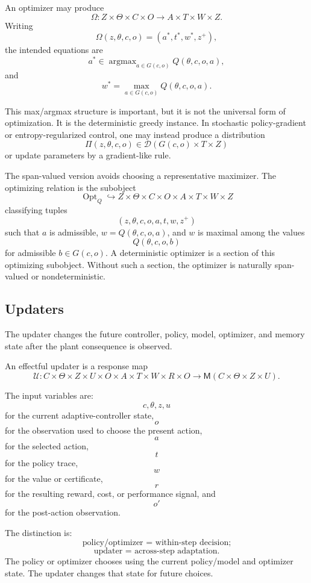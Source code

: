 An optimizer may produce
\[
\Omega:Z\times\Theta\times C\times O
\longrightarrow A\times T\times W\times Z.
\]
Writing
\[
\Omega(z,\theta,c,o)=(a^\ast,t^\ast,w^\ast,z^+),
\]
the intended equations are
\[
a^\ast\in \operatorname{argmax}_{a\in G(c,o)}Q(\theta,c,o,a),
\]
and
\[
w^\ast=\max_{a\in G(c,o)}Q(\theta,c,o,a).
\]

This max/argmax structure is important, but it is not the universal form of optimization.  It is
the deterministic greedy instance.  In stochastic policy-gradient or entropy-regularized control,
one may instead produce a distribution
\[
\Pi(z,\theta,c,o)\in \mathcal D(G(c,o)\times T\times Z)
\]
or update parameters by a gradient-like rule.

The span-valued version avoids choosing a representative maximizer.  The optimizing relation is the
subobject
\[
\operatorname{Opt}_Q
\hookrightarrow
Z\times\Theta\times C\times O\times A\times T\times W\times Z
\]
classifying tuples
\[
(z,\theta,c,o,a,t,w,z^+)
\]
such that \(a\) is admissible, \(w=Q(\theta,c,o,a)\), and \(w\) is maximal among the values
\[
Q(\theta,c,o,b)
\]
for admissible \(b\in G(c,o)\).  A deterministic optimizer is a section of this optimizing
subobject.  Without such a section, the optimizer is naturally span-valued or nondeterministic.

\subsection{Updaters}
\label{subsec:effectful-updaters}

The updater changes the future controller, policy, model, optimizer, and memory state after the
plant consequence is observed.

\begin{definition}
\label{def:effectful-updater}
An effectful updater is a response map
\[
\mathcal U:
C\times\Theta\times Z\times U
\times O\times A\times T\times W\times R\times O
\longrightarrow
\mathsf M(C\times\Theta\times Z\times U).
\]
\end{definition}

The input variables are:
\[
c,\theta,z,u
\]
for the current adaptive-controller state,
\[
o
\]
for the observation used to choose the present action,
\[
a
\]
for the selected action,
\[
t
\]
for the policy trace,
\[
w
\]
for the value or certificate,
\[
r
\]
for the resulting reward, cost, or performance signal,
and
\[
o'
\]
for the post-action observation.

The distinction is:
\[
\boxed{
\text{policy/optimizer = within-step decision;}
}
\]
\[
\boxed{
\text{updater = across-step adaptation.}
}
\]
The policy or optimizer chooses using the current policy/model and optimizer state.  The updater
changes that state for future choices.


